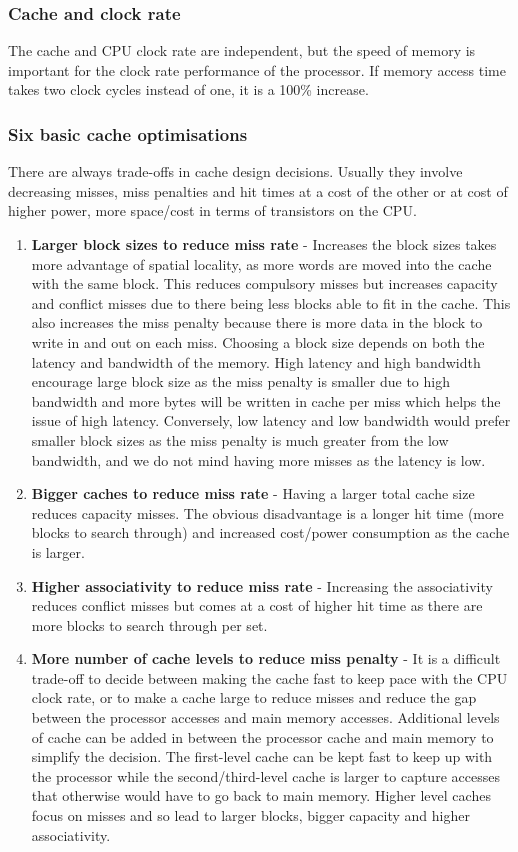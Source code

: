 \documentclass[11pt]{article}
\begin{document}
\subsubsection{Cache and clock rate}
The cache and CPU clock rate are independent, but the speed of memory is important for the clock rate performance of the processor. If memory access time takes two clock cycles instead of one, it is a 100\% increase.
\subsubsection{Six basic cache optimisations}
There are always trade-offs in cache design decisions. Usually they involve decreasing misses, miss penalties and hit times at a cost of the other or at cost of higher power, more space/cost in terms of transistors on the CPU. 
\begin{enumerate}
\item \textbf{Larger block sizes to reduce miss rate} - Increases the block sizes takes more advantage of spatial locality, as more words are moved into the cache with the same block. This reduces compulsory misses but increases capacity and conflict misses due to there being less blocks able to fit in the cache. This also increases the miss penalty because there is more data in the block to write in and out on each miss. 
\n
Choosing a block size depends on both the latency and bandwidth of the memory. High latency and high bandwidth encourage large block size as the miss penalty is smaller due to high bandwidth and more bytes will be written in cache per miss which helps the issue of high latency. Conversely, low latency and low bandwidth would prefer smaller block sizes as the miss penalty is much greater from the low bandwidth, and we do not mind having more misses as the latency is low. 
\item \textbf{Bigger caches to reduce miss rate} - Having a larger total cache size reduces capacity misses. The obvious disadvantage is a longer hit time (more blocks to search through) and increased cost/power consumption as the cache is larger. 
\item \textbf{Higher associativity to reduce miss rate} - Increasing the associativity reduces conflict misses but comes at a cost of higher hit time as there are more blocks to search through per set. 
\item \textbf{More number of cache levels to reduce miss penalty} - It is a difficult trade-off to decide between making the cache fast to keep pace with the CPU clock rate, or to make a cache large to reduce misses and reduce the gap between the processor accesses and main memory accesses. Additional levels of cache can be added in between the processor cache and main memory to simplify the decision. The first-level cache can be kept fast to keep up with the processor while the second/third-level cache is larger to capture accesses that otherwise would have to go back to main memory. Higher level caches focus on misses and so lead to larger blocks, bigger capacity and higher associativity. 

\end{enumerate}
\end{document}
